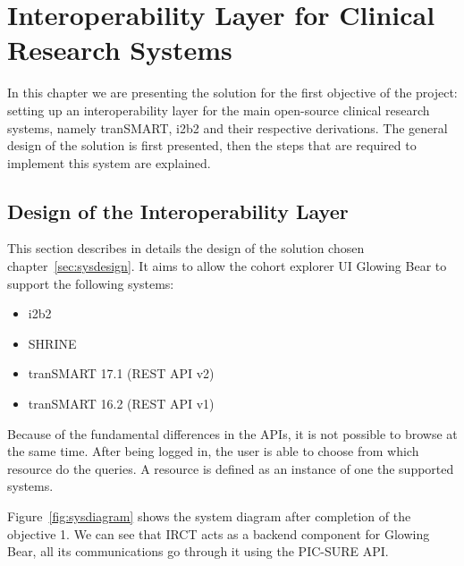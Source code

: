 

\chapter{Interoperability Layer for Clinical Research Systems}

In this chapter we are presenting the solution for the first objective of the project:
setting up an interoperability layer for the main open-source clinical research systems, namely tranSMART, i2b2 and their respective derivations.
The general design of the solution is first presented, then the steps that are required to implement this system are explained.

\section{Design of the Interoperability Layer}
This section describes in details the design of the solution chosen chapter~\ref{sec:sysdesign}. 
It aims to allow the cohort explorer UI Glowing Bear to support the following systems:
\begin{itemize}
    \item i2b2
    \item SHRINE 
    \item tranSMART 17.1 (REST API v2)
    \item tranSMART 16.2 (REST API v1)
\end{itemize}

Because of the fundamental differences in the APIs, it is not possible to browse at the same time. 
After being logged in, the user is able to choose from which resource do the queries.
A resource is defined as an instance of one the supported systems.

Figure~\ref{fig:sysdiagram} shows the system diagram after completion of the objective 1.
We can see that IRCT acts as a backend component for Glowing Bear, all its communications go through it using the PIC-SURE API.

